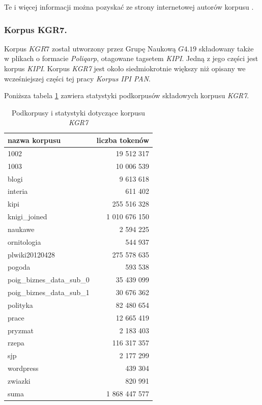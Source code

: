 \documentclass[11pt,a4paper]{llncs}
\begin{document}
Te i więcej informacji można pozyskać ze strony internetowej autorów korpusu \cite{kipi}.

\subsubsection{Korpus KGR7.}

Korpus $KGR7$ został utworzony przez Grupę Naukową $G4.19$ składowany także w plikach o formacie \emph{Poliqarp}, otagowane tagsetem \emph{KIPI}.
Jedną z jego części jest korpus \emph{KIPI}.
Korpus \emph{KGR7} jest około siedmiokrotnie większy niż opisany we wcześniejszej części tej pracy \emph{Korpus IPI PAN}.

Poniższa tabela \ref{kgr7_stats} zawiera statystyki podkorpusów składowych korpusu \emph{KGR7}.
\begin{table}[h!]
\centering
\begin{tabular}{l | r}
	\toprule
	nazwa korpusu & liczba tokenów \\
	\midrule
	1002 & 19 512 317 \\
	1003 & 10 006 539 \\
	blogi & 9 613 618 \\
	interia & 611 402 \\
	kipi & 255 516 328 \\
	knigi\_joined & 1 010 676 150 \\
	naukawe & 2 594 225 \\
	ornitologia & 544 937 \\
	plwiki20120428 & 275 578 635 \\
	pogoda & 593 538 \\
	poig\_biznes\_data\_sub\_0 & 35 439 099 \\
	poig\_biznes\_data\_sub\_1 & 30 676 362 \\
	polityka & 82 480 654 \\
	prace & 12 665 419 \\
	pryzmat & 2 183 403 \\
	rzepa & 116 317 357 \\
	sjp & 2 177 299 \\
	wordpress & 439 304 \\
	zwiazki & 820 991 \\
	\hline
	suma & 1 868 447 577 \\
	\bottomrule
\end{tabular}
\caption[Podkorpusy i statystyki korpusu \emph{KGR7}]{Podkorpusy i statystyki dotyczące korpusu \emph{KGR7}}
\label{kgr7_stats}
\end{table}
\end{document}
